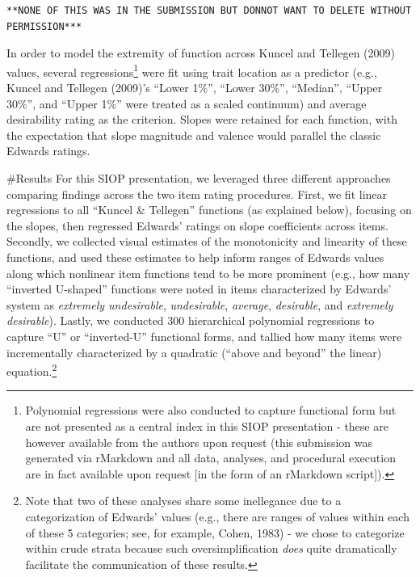 \documentclass[
  english,
  ,jou]{apa6}
\begin{document}
\begin{verbatim}
**NONE OF THIS WAS IN THE SUBMISSION BUT DONNOT WANT TO DELETE WITHOUT PERMISSION***
\end{verbatim}

In order to model the extremity of function across Kuncel and Tellegen (2009) values, several regressions\footnote{Polynomial regressions were also conducted to capture functional form but are not presented as a central index in this SIOP presentation - these are however available from the authors upon request (this submission was generated via rMarkdown and all data, analyses, and procedural execution are in fact available upon request {[}in the form of an rMarkdown script{]}).} were fit using trait location as a predictor (e.g., Kuncel and Tellegen (2009)'s \enquote{Lower 1\%}, \enquote{Lower 30\%}, \enquote{Median}, \enquote{Upper 30\%}, and \enquote{Upper 1\%} were treated as a scaled continuum) and average desirability rating as the criterion. Slopes were retained for each function, with the expectation that slope magnitude and valence would parallel the classic Edwards ratings.

\#Results
For this SIOP presentation, we leveraged three different approaches comparing findings across the two item rating procedures. First, we fit linear regressions to all \enquote{Kuncel \& Tellegen} functions (as explained below), focusing on the slopes, then regressed Edwards' ratings on slope coefficients across items. Secondly, we collected visual estimates of the monotonicity and linearity of these functions, and used these estimates to help inform ranges of Edwards values along which nonlinear item functions tend to be more prominent (e.g., how many \enquote{inverted U-shaped} functions were noted in items characterized by Edwards' system as \emph{extremely undesirable}, \emph{undesirable}, \emph{average}, \emph{desirable}, and \emph{extremely desirable}). Lastly, we conducted 300 hierarchical polynomial regressions to capture \enquote{U} or \enquote{inverted-U} functional forms, and tallied how many items were incrementally characterized by a quadratic (\enquote{above and beyond} the linear) equation.\footnote{Note that two of these analyses share some inellegance due to a categorization of Edwards' values (e.g., there are ranges of values within each of these 5 categories; see, for example, Cohen, 1983) - we chose to categorize within crude strata because such oversimplification \emph{does} quite dramatically facilitate the communication of these results.}
\end{document}
